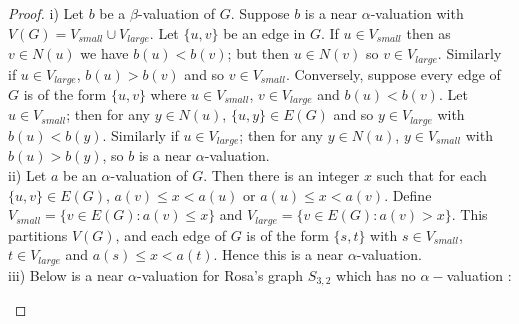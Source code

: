 \documentclass[12pt, a4paper]{article}
\theoremstyle{definition}
\begin{document}
\begin{proof}
i) Let $b$ be a $\beta$-valuation of $G$. Suppose $b$ is a near $\alpha$-valuation with $V(G)=V_{small} \cup V_{large}$.  Let $\{u,v\}$ be an edge in $G$.  If $u\in V_{small}$ then as $v \in N(u)$ we have $b(u)<b(v)$; but then $u \in N(v)$ so $v \in V_{large}$.  Similarly if $u \in V_{large}$, $b(u)>b(v)$ and so $v \in V_{small}$. Conversely, suppose every edge of $G$ is of the form $\{u,v\}$ where $u \in V_{small}$, $v \in V_{large}$ and $b(u)<b(v)$.  Let $u \in V_{small}$; then for any $y \in N(u)$, $\{u,y\} \in E(G)$ and so $y \in V_{large}$ with $b(u)<b(y)$. Similarly if $u \in V_{large}$; then for any $y \in N(u)$, $y \in V_{small}$ with $b(u)>b(y)$, so $b$ is a near $\alpha$-valuation.\\
ii) Let $a$ be an $\alpha$-valuation of $G$. Then there is an integer $x$ such that for each $\{u,v\} \in E(G)$, $a(v) \leq x <a(u)$ or $a(u) \leq x <a(v)$. Define $V_{small}=\{v \in E(G): a(v) \leq x\}$ and $V_{large}=\{ v \in E(G): a(v)>x\}$.  This partitions $V(G)$, and each edge of $G$ is of the form $\{s,t\}$ with $s \in V_{small}$, $t \in V_{large}$ and $a(s) \leq x < a(t)$.  Hence this is a near $\alpha$-valuation.\\
iii) Below is a near $\alpha$-valuation for Rosa's graph $S_{3,2}$ which has no $\alpha-$valuation  \cite{Rosa}:
\begin{center}
    \end{center}
\end{proof}
\end{document}
